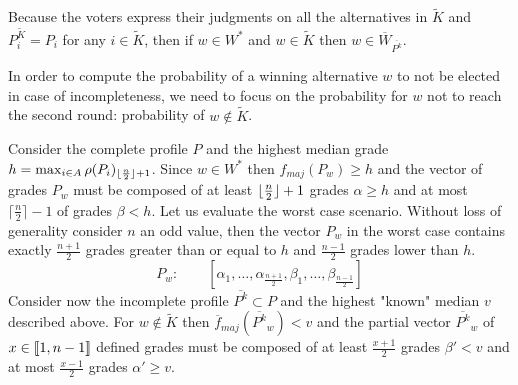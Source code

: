 \documentclass[version=3.21, pagesize, twoside=off, bibliography=totoc, DIV=calc, fontsize=12pt, a4paper]{scrartcl}
\begin{document}
Because the voters express their judgments on all the alternatives in $\tilde{K}$ 
and $P^{\tilde{K}}_{i} = P_i$ for any $i \in \tilde{K}$, then if $w \in W^*$ and $w \in \tilde{K}$ then $w \in \overline{W}_{\overline{P^k}}$.

In order to compute the probability of a winning alternative $w$ to not be elected in case of incompleteness, we need to focus on the probability for $w$ not to reach the second round: probability of $w \notin \tilde{K}$.

Consider the complete profile $P$ and the highest median grade $h=\max_{i\in A}\rho(P_i)_{\lfloor\frac{n}{2}\rfloor + 1}$. Since $w \in W^*$ then $f_{maj}(P_{w})\geq h$ and the vector of grades $P_w$ must be composed of at least $\lfloor\frac{n}{2}\rfloor+1$ grades $\alpha \geq h$ and at most $\lceil \frac{n}{2}\rceil-1$ of grades $\beta < h$. Let us evaluate the worst case scenario.
Without loss of generality consider $n$ an odd value, then the vector $P_{w}$ in the worst case contains exactly $\frac{n+1}{2}$ grades greater than or equal to $h$ and $\frac{n-1}{2}$ grades lower than $h$.
\[P_w : \qquad [ \alpha_1, \dots , \alpha_{\frac{n+1}{2}}, \beta_1, \dots , \beta_{\frac{n-1}{2}} ] \]
Consider now the incomplete profile $\overline{P^k} \subset P$ and the highest "known" median $v$ described above. For $w \notin \tilde{K}$ then $\overline{f}_{maj}(\overline{P^k}_w) < v$ and the partial vector $\overline{P^k}_w$ of $x\in \llbracket1,n-1\rrbracket$ defined grades must be composed of at least $\frac{x+1}{2}$ grades $\beta'<v$ and at most $\frac{x-1}{2}$ grades $\alpha' \geq v$. 
\end{document}
